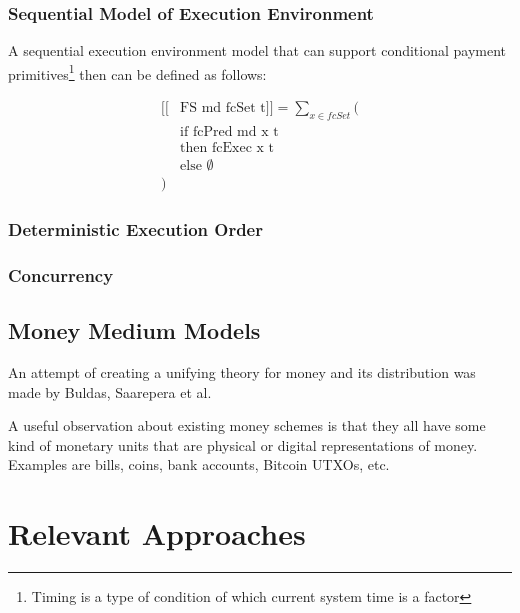 \documentclass[a4paper,10pt]{report}
\begin{document}
\subsubsection{Sequential Model of Execution Environment}

A sequential execution environment model that can support conditional payment primitives\footnote{Timing is a type of
condition of which current system time is a factor} then can be defined as follows:

\begin{equation}
    \begin{split}
        [\![& \text{FS md fcSet t}]\!] = \sum_{x \in fcSet} ( \\
        & \text{if fcPred md x t} \\
        & \text{then fcExec x t} \\
        & \text{else }\emptyset \\
        )
    \end{split}
\end{equation}

\subsubsection{Deterministic Execution Order}

\subsubsection{Concurrency}

\subsection{Money Medium Models}

An attempt of creating a unifying theory for money and its distribution was made by Buldas, Saarepera et
al.\cite{buldas2021unifying}

\begin{displayquote}
A useful observation about existing money schemes is that they all have some kind of monetary units that are physical or
digital representations of money. Examples are bills, coins, bank accounts, Bitcoin UTXOs, etc. \cite{buldas2021unifying}
\end{displayquote}

\section{Relevant Approaches}
\end{document}
